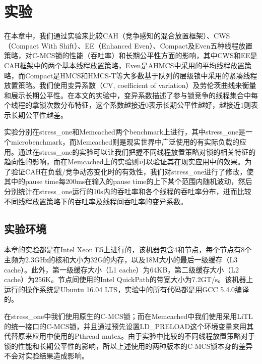 
\chapter{实验}
\label{chap:example}
在本章中，我们通过实验来比较CAH（竞争感知的混合放置框架）、CWS（Compact With Shift）、EE（Enhanced Even）、Compact及Even五种线程放置策略，对C-MCS锁的性能（吞吐率）和长期公平性方面的影响，其中CWS和EE是CAH框架中的两个基本线程放置策略，Even是AHMCS\cite{chabbi2016contention}中采用的平均线程放置策略，而Compact是HMCS\cite{chabbi2015high}和HMCS-T\cite{chabbi2017efficient}等大多数基于队列的层级锁中采用的紧凑线程放置策略。我们使用变异系数（CV, coefficient of variation）及劳伦茨曲线\cite{gini1912variabilita}来衡量和展示长期公平性。在本文的实验中，变异系数描述了参与锁竞争的线程集合中每个线程的拿锁次数分布特征，这个系数越接近0表示长期公平性越好，越接近1则表示长期公平性越差。

实验分别在stress\_one和Memcached两个benchmark上进行，其中stress\_one是一个microbenchmark，而Memcached则是现实世界中广泛使用的有实际负载的应用。通过在stress\_one的实验可以让我们把握不同线程放置策略对锁的相关特征的趋向性的影响，而在Memcached上的实验则可以验证其在现实应用中的效果。为了验证CAH在负载/竞争动态变化时的有效性，我们对stress\_one进行了修改，使其中的pause time每200ms在输入的pause time的上下某个范围内随机波动，然后分别统计在stress\_one运行的10s内的吞吐率和各个线程的吞吐率分布，进而比较不同线程放置策略下的吞吐率及线程间吞吐率的变异系数。

\section{实验环境}
本章的实验都是在Intel Xeon E5上进行的，该机器包含4和节点，每个节点有8个主频为2.3GHz的核和大小为32G的内存，以及18M大小的最后一级缓存（L3 cache）。此外，第一级缓存大小（L1 cache）为64KB，第二级缓存大小（L2 cache）为256K。节点间使用的Intel QuickPath的带宽大小为7.2GT/s。该机器上运行的操作系统是Ubuntu 16.04 LTS，实验中的所有代码都是用GCC 5.4.0编译的。

在stress\_one中我们使用原生的C-MCS锁；而在Memcached中我们使用采用LiTL的统一接口的C-MCS锁，并且通过预先设置LD\_PRELOAD这个环境变量来用其代替原来应用中使用的Pthread mutex。由于实验中比较的不同线程放置策略对于锁的性能和长期公平性的影响，所以上述使用的两种版本的C-MCS锁本身的差异不会对实验结果造成影响。

